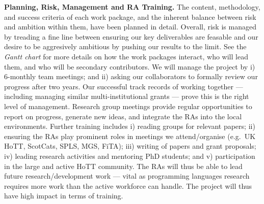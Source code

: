 \documentclass[a4paper,11pt]{article}
\newcommand{\eg}{{e.g.}\ }
\begin{document}
{\bf Planning, Risk, Management and RA Training.}  The content,
methodology, and success criteria of each work package, and the
inherent balance between risk and ambition within them, have been
planned in detail.  Overall, risk is managed by treading a fine line
between ensuring our key deliverables are feasable and our desire to
be aggresively ambitious by pushing our results to the limit. See the
{\em Gantt chart} for more details on how the work packages interact,
who will lead them, and who will be secondary contributors.
We will manage the project by i)
6-monthly team meetings; and ii) asking our collaborators to formally
review our progress after two years.  Our successful
track records of working together --- including managing similar
multi-institutional grants --- prove this is the right level of
management. Research group meetings provide regular opportunities to
report on progress, generate new ideas, and integrate the RAs into the
local environments. Further training includes i) reading groups for
relevant papers; ii) ensuring the RAs play prominent roles in meetings
we attend/organise (\eg UK HoTT, ScotCats, SPLS, MGS, FiTA); iii)
writing of papers and grant proposals; iv) leading research activities
and mentoring PhD students; and v) participation in the large and
active HoTT community. The RAs will thus be able to lead future
research/development work --- vital as programming languages research
requires more work than the active workforce can handle. The
project will thus have high impact in terms of training.







\begin{footnotesize}
\begin{multicols}{2}

%
%

\end{multicols}
\end{footnotesize}

% 
% 
\end{document}
